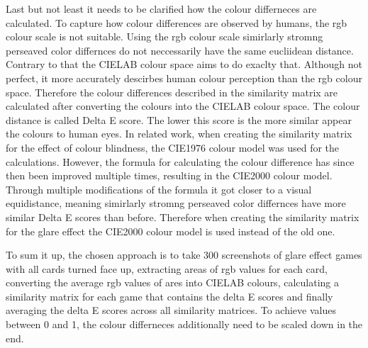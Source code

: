 Last but not least it needs to be clarified how the colour differneces are calculated. To capture how colour differences are observed by humans, the rgb colour scale is not suitable. Using the rgb colour scale simirlarly stromng perseaved color differnces do not neccessarily have the same eucliidean distance. Contrary to that the CIELAB colour space aims to do exaclty that. Although not perfect, it more accurately descirbes human colour perception than the rgb colour space. Therefore the colour differences described in the similarity matrix are calculated after converting the colours into the CIELAB colour space. The colour distance is called Delta E score. The lower this score is the more similar appear the colours to human eyes. In related work, when creating the similarity matrix for the effect of colour blindness, the CIE1976 colour model was used for the calculations. However, the formula for calculating the colour difference has since then been improved multiple times, resulting in the CIE2000 colour model. Through multiple modifications of the formula it got closer to a visual equidistance, meaning simirlarly stromng perseaved color differnces have more similar Delta E scores than before. Therefore when creating the similarity matrix for the glare effect the CIE2000 colour model is used instead of the old one. 

To sum it up, the chosen approach is to take 300 screenshots of glare effect games with all cards turned face up, extracting areas of rgb values for each card, converting the average rgb values of ares into CIELAB colours, calculating a similarity matrix for each game that contains the delta E scores and finally averaging the delta E scores across all similarity matrices. To achieve values between 0 and 1, the colour differneces additionally need to be scaled down in the end.
 
